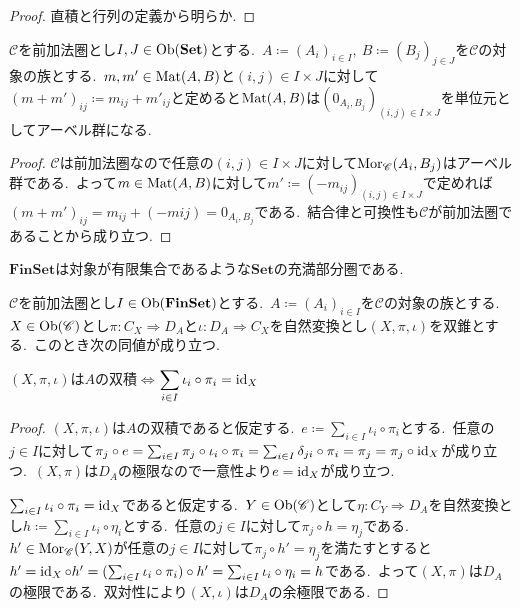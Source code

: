 \begin{proof}
直積と行列の定義から明らか.
\end{proof}

\begin{proposition} \label{prop: matrix_abelian_group}
$\mathscr{C}$を前加法圏とし$I,J \in \operatorname{Ob}(\mathbf{Set})$とする.\
$A \coloneq (A_i)_{i \in I},\ B \coloneq (B_j)_{j \in J}$を$\mathscr{C}$の対象の族とする.\
$m, m' \in \operatorname{Mat}(A,B)$と$(i,j) \in I \times J$に対して$(m + m')_{ij} \coloneq m_{ij} + m'_{ij}$と定めると$\operatorname{Mat}(A,B)$は$(0_{A_i,B_j})_{(i,j) \in I \times J}$を単位元としてアーベル群になる.
\end{proposition}

\begin{proof}
$\mathscr{C}$は前加法圏なので任意の$(i,j) \in I \times J$に対して$\operatorname{Mor}_{\mathscr{C}}(A_i, B_j)$はアーベル群である.\
よって$m \in \operatorname{Mat}(A,B)$に対して$m' \coloneq (-m_{ij})_{(i,j) \in I \times J}$で定めれば$(m + m')_{ij} = m_{ij} + (-m{ij}) = 0_{A_i, B_j}$である.\
結合律と可換性も$\mathscr{C}$が前加法圏であることから成り立つ.
\end{proof}

\begin{remark} \label{rem: finset_full_subcategory}
$\mathbf{FinSet}$は対象が有限集合であるような$\mathbf{Set}$の充満部分圏である.
\end{remark}

\begin{lemma} \label{lem: biproduct_iff_sum_eq_id}
$\mathscr{C}$を前加法圏とし$I \in \operatorname{Ob}(\mathbf{FinSet})$とする.\
$A \coloneq (A_i)_{i \in I}$を$\mathscr{C}$の対象の族とする.\
$X \in \operatorname{Ob}(\mathscr{C})$とし$\pi \colon C_X \Rightarrow D_A$と$\iota \colon D_A \Rightarrow C_X$を自然変換とし$(X ,\pi, \iota)$を双錐とする.\
このとき次の同値が成り立つ.
\begin{center}
$(X,\pi,\iota)$は$A$の双積$\iff$$\displaystyle \sum_{i \in I}\iota_i \circ \pi_i = \operatorname{id}_X$
\end{center}
\end{lemma}

\begin{proof}
$(X, \pi, \iota)$は$A$の双積であると仮定する.\
$e \coloneq \sum_{i \in I} \iota_i \circ \pi_i$とする.\
任意の$j \in I$に対して$\pi_j \circ e = \sum_{i \in I} \pi_j \circ \iota_i \circ \pi_i = \sum_{i \in I} \delta_{ji} \circ \pi_i = \pi_j = \pi_j \circ \operatorname{id}_X$が成り立つ.\
$(X, \pi)$は$D_A$の極限なので一意性より$e = \operatorname{id}_X$が成り立つ.

$\sum_{i \in I} \iota_i \circ \pi_i = \operatorname{id}_X$であると仮定する.\
$Y \in \operatorname{Ob}(\mathscr{C})$として$\eta \colon C_Y \Rightarrow D_A$を自然変換とし$h \coloneq \sum_{i \in I} \iota_i \circ \eta_i$とする.\
任意の$j \in I$に対して$\pi_j \circ h = \eta_j$である.\
$h' \in \operatorname{Mor}_{\mathscr{C}}(Y,X)$が任意の$j \in I$に対して$\pi_j \circ h' = \eta_j$を満たすとすると$h' = \operatorname{id}_X \circ h' = (\sum_{i \in I} \iota_i \circ \pi_i) \circ h' = \sum_{i \in I} \iota_i \circ \eta_i = h$である.\
よって$(X, \pi)$は$D_A$の極限である.\ 双対性により$(X, \iota)$は$D_A$の余極限である.
\end{proof}

